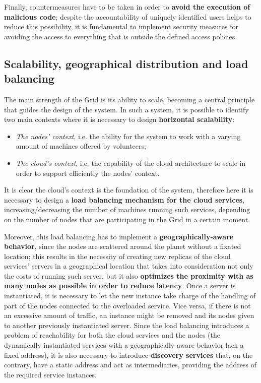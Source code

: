 Finally, countermeasures have to be taken in order to \textbf{avoid the execution of malicious code}; despite the accountability of uniquely identified users helps to reduce this possibility, it is fundamental to implement security measures for avoiding the access to everything that is outside the defined access policies.

\subsection{Scalability, geographical distribution and load balancing}\label{scalabilitu_geographical_distribution_and_load_balancing}
The main strength of the Grid is its ability to scale, becoming a central principle that guides the design of the system. In such a system, it is possible to identify two main contexts where it is necessary to design \textbf{horizontal scalability}:
\vspace{5mm}
\begin{itemize}
    \item \textit{The nodes' context}, i.e. the ability for the system to work with a varying amount of machines offered by volunteers;
    \item \textit{The cloud's context}, i.e. the capability of the cloud architecture to scale in order to support efficiently the nodes' context.
\end{itemize}

It is clear the cloud's context is the foundation of the system, therefore here it is necessary to design a \textbf{load balancing mechanism for the cloud services}, increasing/decreasing the number of machines running such services, depending on the number of nodes that are participating in the Grid in a certain moment.

Moreover, this load balancing has to implement a \textbf{geographically-aware behavior}, since the nodes are scattered around the planet without a fixated location; this results in the necessity of creating new replicas of the cloud services' servers in a geographical location that takes into consideration not only the costs of running such server, but it also \textbf{optimizes the proximity with as many nodes as possible in order to reduce latency}. Once a server is instantiated, it is necessary to let the new instance take charge of the handling of part of the nodes connected to the overloaded service. Vice versa, if there is not an excessive amount of traffic, an instance might be removed and its nodes given to another previously instantiated server.
Since the load balancing introduces a problem of reachability for both the cloud services and the nodes (the dynamically instantiated services with a geographically-aware behavior lack a fixed address), it is also necessary to introduce \textbf{discovery services} that, on the contrary, have a static address and act as intermediaries, providing the address of the required service instances.


